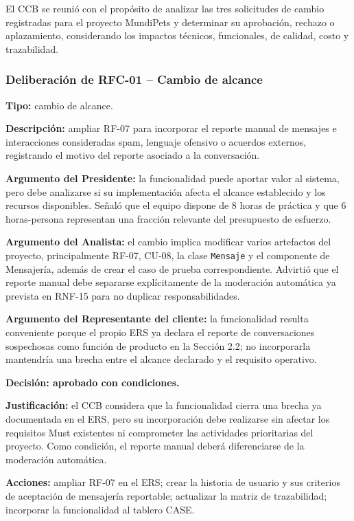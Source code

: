 \documentclass[journal,onecolumn]{IEEEtran}
\begin{document}
	El CCB se reunió con el propósito de analizar las tres solicitudes de cambio registradas para el
	proyecto MundiPets y determinar su aprobación, rechazo o aplazamiento, considerando los impactos
	técnicos, funcionales, de calidad, costo y trazabilidad.
	
	\subsubsection{Deliberación de RFC-01 -- Cambio de alcance}
	
	\textbf{Tipo:} cambio de alcance.
	
	\textbf{Descripción:} ampliar RF-07 para incorporar el reporte manual de mensajes e interacciones
	consideradas spam, lenguaje ofensivo o acuerdos externos, registrando el motivo del reporte
	asociado a la conversación.
	
	\textbf{Argumento del Presidente:} la funcionalidad puede aportar valor al sistema, pero debe
	analizarse si su implementación afecta el alcance establecido y los recursos disponibles. Señaló
	que el equipo dispone de 8 horas de práctica y que 6 horas-persona representan una fracción
	relevante del presupuesto de esfuerzo.
	
	\textbf{Argumento del Analista:} el cambio implica modificar varios artefactos del proyecto,
	principalmente RF-07, CU-08, la clase \texttt{Mensaje} y el componente de Mensajería, además de
	crear el caso de prueba correspondiente. Advirtió que el reporte manual debe separarse
	explícitamente de la moderación automática ya prevista en RNF-15 para no duplicar
	responsabilidades.
	
	\textbf{Argumento del Representante del cliente:} la funcionalidad resulta conveniente porque el
	propio ERS ya declara el reporte de conversaciones sospechosas como función de producto en la
	Sección 2.2; no incorporarla mantendría una brecha entre el alcance declarado y el requisito
	operativo.
	
	\textbf{Decisión: aprobado con condiciones.}
	
	\textbf{Justificación:} el CCB considera que la funcionalidad cierra una brecha ya documentada en
	el ERS, pero su incorporación debe realizarse sin afectar los requisitos Must existentes ni
	comprometer las actividades prioritarias del proyecto. Como condición, el reporte manual deberá
	diferenciarse de la moderación automática.
	
	\textbf{Acciones:} ampliar RF-07 en el ERS; crear la historia de usuario y sus criterios de
	aceptación de mensajería reportable; actualizar la matriz de trazabilidad; incorporar la
	funcionalidad al tablero CASE.
	
\end{document}
